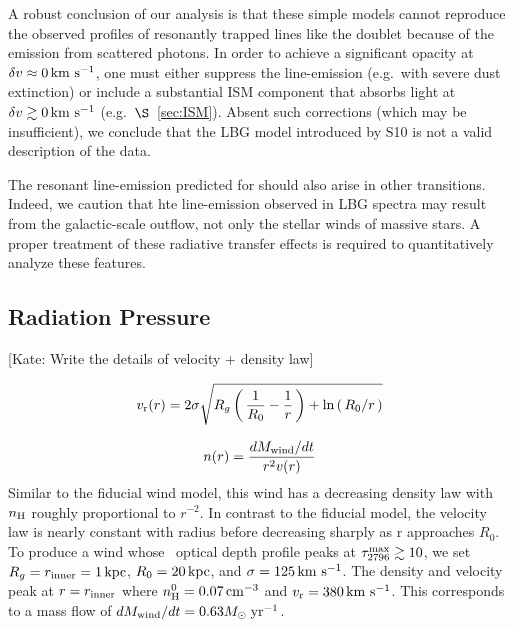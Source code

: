 \documentclass[12pt,preprint]{aastex}
\begin{document}
A robust conclusion of our
analysis is that these simple models cannot reproduce the
observed profiles of resonantly trapped lines like the 
doublet because of the emission from scattered photons.  In order to
achieve a significant opacity at $\delta v \approx 0 \, {\rm km~s^{-1}}$, one must
either suppress the line-emission (e.g.\ with severe dust extinction) 
or include a substantial ISM component that absorbs light at $\delta v
\gtrsim 0 \, {\rm km~s^{-1}}$ (e.g.\ $\S$~\ref{sec:ISM}).  
Absent such corrections (which may be insufficient),
we conclude that the LBG model
introduced by S10 is not a valid description of the data.

The resonant line-emission predicted for  should also arise
in other transitions.  Indeed, we caution that hte 
line-emission observed in LBG spectra
\citep[e.g.][]{prs+02} may result from the galactic-scale outflow, not
only the stellar winds of massive stars.
A proper treatment of these radiative transfer effects is required to
quantitatively analyze these features.

\subsection{Radiation Pressure}
\label{sec:radiative}

[Kate: Write the details of velocity + density law]

\begin{equation}
v_{\rm r}(r) = 2\sigma \sqrt{R_g \left ( \, \frac{1}{R_0} - \frac{1}{r} \, \right )
   + \ln\left ( \, R_0/r \, \right ) }
\end{equation}

\begin{equation}
n(r) = \frac{dM_{\rm wind}/dt}{r^2 v(r)}
\end{equation}
Similar to the fiducial wind model, this wind has a decreasing density
law with $n_{\rm H}$ roughly proportional to $r^{-2}$. 
In contrast to the fiducial model, the velocity law is nearly
constant  with radius before decreasing sharply as r approaches $R_0$.
To produce a wind whose \mgiia\ optical depth profile peaks at 
$\tau_{2796}^{\rm max} \gtrsim 10$, we set $R_g = r_{\rm inner} =
1\,\rm kpc$, $R_0=20\,\rm kpc$, and $\sigma = 125 \, {\rm km~s^{-1}}$.  The density
and velocity peak at $r=r_{\rm inner}$ where $n_{\rm H}^0 = 0.07
\, {\rm cm^{-3}}$ and $v_{\rm r} = 380 \, {\rm km~s^{-1}}$.  This corresponds to a mass flow of
$dM_{\rm wind}/dt = 0.63 M_\odot\; \rm yr^{-1}$.  
\end{document}
